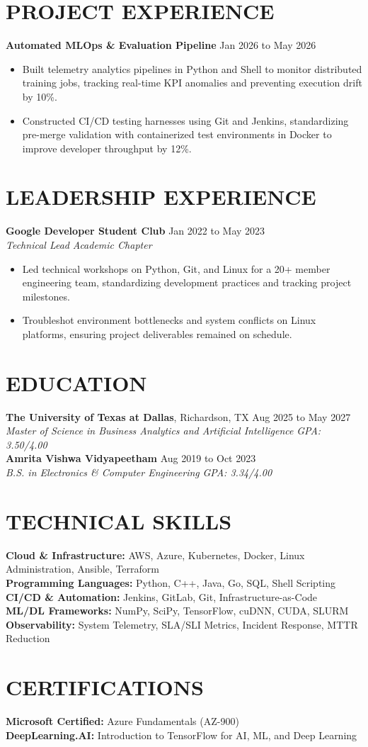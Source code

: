 \documentclass[11pt,letterpaper]{article}
\begin{document}
\section*{PROJECT EXPERIENCE}
\noindent\small \textbf{Automated MLOps \& Evaluation Pipeline} \hfill Jan 2026 to May 2026
\begin{itemize}
\item Built telemetry analytics pipelines in Python and Shell to monitor distributed training jobs, tracking real-time KPI anomalies and preventing execution drift by 10\%.
\item Constructed CI/CD testing harnesses using Git and Jenkins, standardizing pre-merge validation with containerized test environments in Docker to improve developer throughput by 12\%.
\end{itemize}
\section*{LEADERSHIP EXPERIENCE}
\noindent\small \textbf{Google Developer Student Club} \hfill Jan 2022 to May 2023 \\
\textit{Technical Lead} \hfill \textit{Academic Chapter}
\begin{itemize}
\item Led technical workshops on Python, Git, and Linux for a 20+ member engineering team, standardizing development practices and tracking project milestones.
\item Troubleshot environment bottlenecks and system conflicts on Linux platforms, ensuring project deliverables remained on schedule.
\end{itemize}
\section*{EDUCATION}
\noindent\small \textbf{The University of Texas at Dallas}, Richardson, TX \hfill Aug 2025 to May 2027 \\
\textit{Master of Science in Business Analytics and Artificial Intelligence} \hfill \textit{GPA: 3.50/4.00} \\
\noindent\small \textbf{Amrita Vishwa Vidyapeetham} \hfill Aug 2019 to Oct 2023 \\
\textit{B.S. in Electronics \& Computer Engineering} \hfill \textit{GPA: 3.34/4.00}
\section*{TECHNICAL SKILLS}
\noindent\small \textbf{Cloud \& Infrastructure:} AWS, Azure, Kubernetes, Docker, Linux Administration, Ansible, Terraform \\
\textbf{Programming Languages:} Python, C++, Java, Go, SQL, Shell Scripting \\
\textbf{CI/CD \& Automation:} Jenkins, GitLab, Git, Infrastructure-as-Code \\
\textbf{ML/DL Frameworks:} NumPy, SciPy, TensorFlow, cuDNN, CUDA, SLURM \\
\textbf{Observability:} System Telemetry, SLA/SLI Metrics, Incident Response, MTTR Reduction
\section*{CERTIFICATIONS}
\noindent\small \textbf{Microsoft Certified:} Azure Fundamentals (AZ-900) \\
\textbf{DeepLearning.AI:} Introduction to TensorFlow for AI, ML, and Deep Learning
\end{document}
